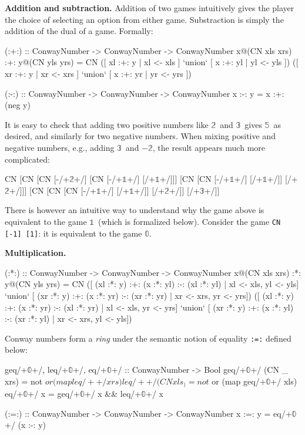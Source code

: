 \documentclass[authoryear,preprint]{sigplanconf}
\newcommand{\zerog}{$\mathbb{0}$}
\newcommand{\oneg}{$\mathbb{1}$}
\newcommand{\twog}{$\mathbb{2}$}
\newcommand{\threeg}{$\mathbb{3}$}
\newcommand{\fiveg}{$\mathbb{5}$}
\begin{document}
\noindent\textbf{Addition and subtraction.} Addition of two games intuitively
gives the player the choice of selecting an option from either
game. Substraction is simply the addition of the dual of a game. Formally:
\begin{code}
(:+:) :: ConwayNumber -> ConwayNumber -> ConwayNumber
x@(CN xls xrs) :+: y@(CN yls yrs) = 
  CN 
    ([ xl :+: y | xl <- xls ] `union`
     [ x :+: yl | yl <- yls ])
    ([ xr :+: y | xr <- xrs ] `union`
     [ x :+: yr | yr <- yrs ])

(:-:) :: ConwayNumber -> ConwayNumber -> ConwayNumber
x :-: y = x :+: (neg y) 
\end{code}
It is easy to check that adding two positive numbers like \twog\ and
\threeg\ gives \fiveg\ as desired, and similarly for two negative
numbers. When mixing positive and negative numbers, e.g., adding \threeg\ and
$-$\twog, the result appears much more complicated:
\begin{code}
CN [CN  [CN  [-/+\twog+/] 
             [CN [-/+\oneg+/] [/+\oneg+/]]] 
        [CN  [CN [-/+\oneg+/] [/+\oneg+/]] 
             [/+\twog+/]]] 
   [CN  [CN  [CN [-/+\oneg+/] [/+\oneg+/]] 
             [/+\twog+/]] 
        [/+\threeg+/]]
\end{code}
There is however an intuitive way to understand why the game above is
equivalent to the game \oneg\ (which is formalized below). Consider the game
\lstinline{CN [-1] [1]}: it is equivalent to the game \zerog.

\noindent\textbf{Multiplication.} 

\begin{code}
(:*:) :: ConwayNumber -> ConwayNumber -> ConwayNumber
x@(CN xls xrs) :*: y@(CN yls yrs) = 
  CN 
    ([ (xl :*: y) :+: (x :*: yl) :-: (xl :*: yl)
     | xl <- xls, yl <- yls] `union`
     [ (xr :*: y) :+: (x :*: yr) :-: (xr :*: yr)
     | xr <- xrs, yr <- yrs])
    ([ (xl :*: y) :+: (x :*: yr) :-: (xl :*: yr)
     | xl <- xls, yr <- yrs] `union`
     [ (xr :*: y) :+: (x :*: yl) :-: (xr :*: yl)
     | xr <- xrs, yl <- yls])
\end{code}

Conway numbers form a \emph{ring} under the semantic notion of equality
\lstinline$:=:$ defined below:
\begin{code}
geq/+\zerog+/, leq/+\zerog+/, eq/+\zerog+/ :: ConwayNumber -> Bool
geq/+\zerog+/ (CN _ xrs)  = not $ or (map leq/+\zerog+/ xrs) 
leq/+\zerog+/ (CN xls _)  = not $ or (map geq/+\zerog+/ xls) 
eq/+\zerog+/ x            = geq/+\zerog+/ x && leq/+\zerog+/ x 

(:=:) :: ConwayNumber -> ConwayNumber -> ConwayNumber
x :=: y = eq/+\zerog+/ (x :-: y)
\end{code}



\softraggedright

\end{document}
